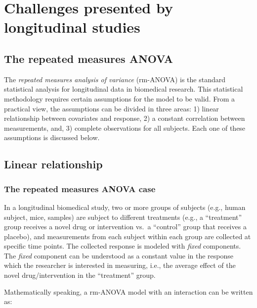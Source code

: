 \documentclass[
]{article}
\begin{document}
\FloatBarrier

\hypertarget{challenges-presented-by-longitudinal-studies}{%
\section{Challenges presented by longitudinal studies}\label{challenges-presented-by-longitudinal-studies}}

\hypertarget{the-repeated-measures-anova}{%
\subsection{The repeated measures ANOVA}\label{the-repeated-measures-anova}}

The \emph{repeated measures analysis of variance} (rm-ANOVA) is the standard statistical analysis for longitudinal data in biomedical research. This statistical methodology requires certain assumptions for the model to be valid. From a practical view, the assumptions can be divided in three areas: 1) linear relationship between covariates and response, 2) a constant correlation between measurements, and, 3) complete observations for all subjects. Each one of these assumptions is discussed below.

\hypertarget{linear-relationship}{%
\subsection{Linear relationship}\label{linear-relationship}}

\hypertarget{the-repeated-measures-anova-case}{%
\subsubsection{The repeated measures ANOVA case}\label{the-repeated-measures-anova-case}}

In a longitudinal biomedical study, two or more groups of subjects (e.g., human subject, mice, samples) are subject to different treatments (e.g., a ``treatment'' group receives a novel drug or intervention vs.~a ``control'' group that receives a placebo), and measurements from each subject within each group are collected at specific time points. The collected response is modeled with \emph{fixed} components. The \emph{fixed} component can be understood as a constant value in the response which the researcher is interested in measuring, i.e., the average effect of the novel drug/intervention in the ``treatment'' group.

Mathematically speaking, a rm-ANOVA model with an interaction can be written as:
\end{document}

